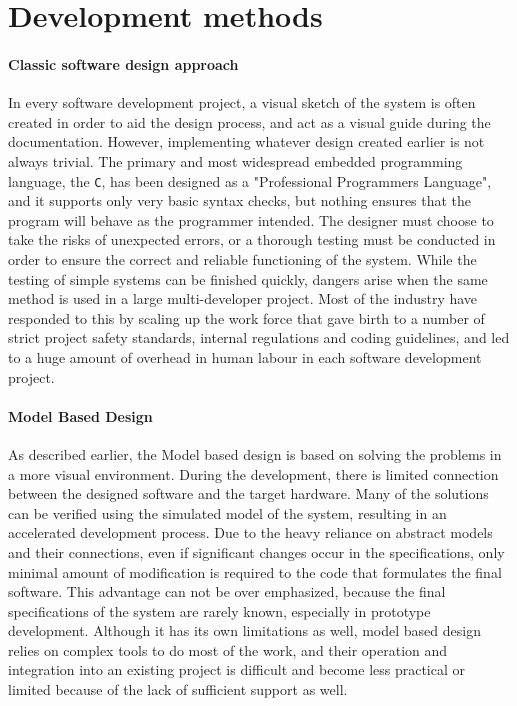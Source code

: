 \section{Development methods}

\paragraph{Classic software design approach}

In every software development project, a visual sketch of the system is often created in order to aid the design process, and act as a visual guide during the documentation. However, implementing whatever design created earlier is not always trivial. The primary and most widespread embedded programming language, the \verb!C!, has been designed as a "Professional Programmers Language"\cite{essentialc}, and it supports only very basic syntax checks, but nothing ensures that the program will behave as the programmer intended. The designer must choose to take the risks of unexpected errors, or a thorough testing must be conducted in order to ensure the correct and reliable functioning of the system. While the testing of simple systems can be finished quickly, dangers arise when the same method is used in a large multi-developer project. Most of the industry have responded to this by scaling up the work force that gave birth to a number of strict project safety standards, internal regulations and coding guidelines\cite{misra}, and led to a huge amount of overhead in human labour in each software development project.

\paragraph{Model Based Design}

As described earlier, the Model based design is based on solving the problems in a more visual environment. During the development, there is  limited connection between the designed software and the target hardware. Many of the solutions can be verified using the simulated model of the system, resulting in an accelerated development process\cite{locomotive}.
Due to the heavy reliance on abstract models and their connections, even if significant changes occur in the specifications, only minimal amount of modification is required to the code that formulates the final software. This advantage can not be over emphasized, because the final specifications of the system are rarely known, especially in prototype development.
Although it has its own limitations as well, model based design relies on complex tools to do most of the work, and their operation and integration into an existing project is difficult and become less practical or limited because of the lack of sufficient support as well.

